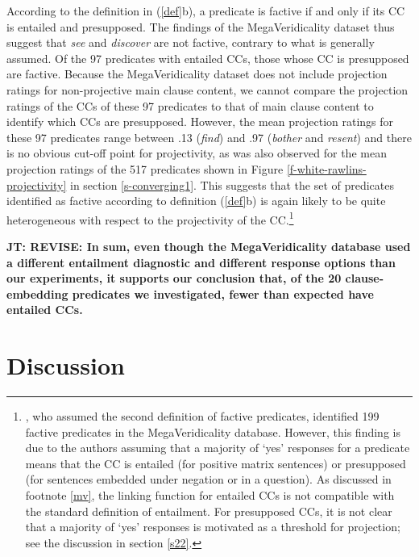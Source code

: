\documentclass[11pt,fleqn]{article}
\newcommand{\6}{\mbox{$[\hspace*{-.6mm}[$}}
\newcommand{\9}{\mbox{$]\hspace*{-.6mm}]$}}
\newcommand{\jt}[1]{\textbf{\color{blue}JT: #1}}
\begin{document}
{According to the definition in (\ref{def}b), a predicate is factive if and only if its CC is entailed and presupposed. The findings of the MegaVeridicality dataset thus suggest that {\em see} and {\em discover} are not factive, contrary to what is generally assumed. Of the 97 predicates with entailed CCs, those whose CC is presupposed are factive. Because the MegaVeridicality dataset does not include projection ratings for non-projective main clause content, we cannot compare the projection ratings of the CCs of these 97 predicates to that of main clause content to identify which CCs are presupposed. However, the mean projection ratings for these 97 predicates range between .13 ({\em find}) and .97 ({\em bother} and {\em resent}) and there is no obvious cut-off point for projectivity, as was also observed for the  mean projection ratings of the 517 predicates shown in Figure \ref{f-white-rawlins-projectivity} in section \ref{s-converging1}. This suggests that the set of predicates identified as factive according to definition (\ref{def}b) is again likely to be quite heterogeneous with respect to the projectivity of the CC.\footnote{\citet{white-rawlins-nels2018}, who assumed the second definition of factive predicates, identified 199 factive predicates in the MegaVeridicality database. However,  this finding is due to the authors assuming that a majority of `yes' responses for a predicate means that the CC is entailed (for positive matrix sentences) or presupposed (for sentences embedded under negation or in a question). As discussed in footnote \ref{mv}, the linking function for entailed CCs is not compatible with the standard definition of entailment. For presupposed CCs, it is not clear that a majority of `yes' responses is motivated as a threshold for projection; see the discussion in section \ref{s22}.} 


\jt{REVISE: In sum, even though the MegaVeridicality database used a different entailment diagnostic and different response options than our experiments, it supports our conclusion that, of the 20 clause-embedding predicates we investigated, fewer than expected have entailed CCs.}


\section{Discussion}\label{s4}

}
\end{document}
